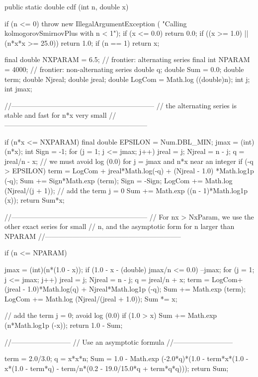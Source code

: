 \begin{code}

   public static double cdf (int n, double x)\begin{hide} {
      if (n <= 0)
        throw new IllegalArgumentException (
                             "Calling kolmogorovSmirnovPlus with n < 1");
      if (x <= 0.0)
         return 0.0;
      if ((x >= 1.0) || (n*x*x >= 25.0))
         return 1.0;
      if (n == 1)
         return x;

      final double NXPARAM = 6.5;      // frontier: alternating series
      final int NPARAM = 4000;         // frontier: non-alternating series
      double q;
      double Sum = 0.0;
      double term;
      double Njreal;
      double jreal;
      double LogCom = Math.log ((double)n);
      int j;
      int jmax;

      //--------------------------------------------------------------
      // the alternating series is stable and fast for n*x very small
      //--------------------------------------------------------------

      if (n*x <= NXPARAM) {
         final double EPSILON = Num.DBL_MIN;
         jmax = (int)(n*x);
         int Sign = -1;
         for (j = 1; j <= jmax; j++) {
            jreal = j;
            Njreal = n - j;
            q = jreal/n - x;
            // we must avoid log (0.0) for j = jmax and n*x near an integer
            if (-q > EPSILON) {
               term = LogCom + jreal*Math.log(-q) + (Njreal - 1.0)
                       *Math.log1p (-q);
               Sum += Sign*Math.exp (term);
            }
            Sign = -Sign;
            LogCom += Math.log (Njreal/(j + 1));
         }
         // add the term j = 0
         Sum += Math.exp ((n - 1)*Math.log1p (x));
         return Sum*x;
      }

      //-----------------------------------------------------------
      // For nx > NxParam, we use the other exact series for small
      // n, and the asymptotic form for n larger than NPARAM
      //-----------------------------------------------------------

      if (n <= NPARAM) {
         jmax = (int)(n*(1.0 - x));
         if (1.0 - x - (double) jmax/n <= 0.0)
            --jmax;
         for (j = 1; j <= jmax; j++) {
            jreal = j;
            Njreal = n - j;
            q = jreal/n + x;
            term = LogCom+(jreal - 1.0)*Math.log(q) + Njreal*Math.log1p (-q);
            Sum += Math.exp (term);
            LogCom += Math.log (Njreal/(jreal + 1.0));
         }
         Sum *= x;

         // add the term j = 0; avoid log (0.0)
         if (1.0 > x)
            Sum += Math.exp (n*Math.log1p (-x));
         return 1.0 - Sum;
      }

      //--------------------------
      // Use an asymptotic formula
      //--------------------------

      term = 2.0/3.0;
      q = x*x*n;
      Sum = 1.0 - Math.exp (-2.0*q)*(1.0 - term*x*(1.0 - x*(1.0 - term*q)
            - term/n*(0.2 - 19.0/15.0*q + term*q*q)));
      return Sum;
   }\end{hide}
\end{code}
